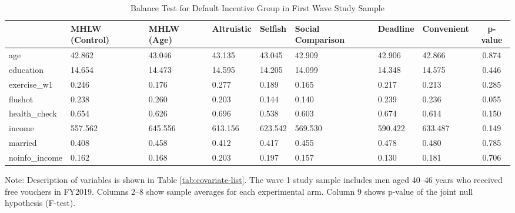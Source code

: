 \begin{table}[!h]

\caption{Balance Test for Default Incentive Group in First Wave Study Sample \label{tab:int-coupon1-balance}}
\centering
\fontsize{9}{11}\selectfont
\begin{threeparttable}
\begin{tabular}[t]{l>{\centering\arraybackslash}p{3em}>{\centering\arraybackslash}p{3em}>{\centering\arraybackslash}p{3em}>{\centering\arraybackslash}p{3em}>{\centering\arraybackslash}p{3em}>{\centering\arraybackslash}p{3em}>{\centering\arraybackslash}p{3em}c}
\toprule
  & MHLW (Control) & MHLW (Age) & Altruistic & Selfish & Social Comparison & Deadline & Convenient & p-value\\
\midrule
age & \num{42.862} & \num{43.046} & \num{43.135} & \num{43.045} & \num{42.909} & \num{42.906} & \num{42.866} & \num{0.874}\\
education & \num{14.654} & \num{14.473} & \num{14.595} & \num{14.205} & \num{14.099} & \num{14.348} & \num{14.575} & \num{0.446}\\
exercise\_w1 & \num{0.246} & \num{0.176} & \num{0.277} & \num{0.189} & \num{0.165} & \num{0.217} & \num{0.213} & \num{0.285}\\
flushot & \num{0.238} & \num{0.260} & \num{0.203} & \num{0.144} & \num{0.140} & \num{0.239} & \num{0.236} & \num{0.055}\\
health\_check & \num{0.654} & \num{0.626} & \num{0.696} & \num{0.538} & \num{0.603} & \num{0.674} & \num{0.614} & \num{0.150}\\
income & \num{557.562} & \num{645.556} & \num{613.156} & \num{623.542} & \num{569.530} & \num{590.422} & \num{633.487} & \num{0.149}\\
married & \num{0.408} & \num{0.458} & \num{0.412} & \num{0.417} & \num{0.455} & \num{0.478} & \num{0.480} & \num{0.785}\\
noinfo\_income & \num{0.162} & \num{0.168} & \num{0.203} & \num{0.197} & \num{0.157} & \num{0.130} & \num{0.181} & \num{0.706}\\
\bottomrule
\end{tabular}
\begin{tablenotes}
\item Note: Description of variables is shown in Table \ref{tab:covariate-list}. The wave 1 study sample includes men aged 40--46 years who received free vouchers in FY2019. Columns 2--8 show sample averages for each experimental arm. Column 9 shows p-value of the joint null hypothesis (F-test).
\end{tablenotes}
\end{threeparttable}
\end{table}

